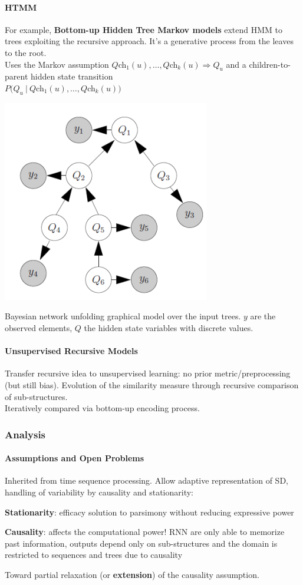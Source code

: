 \documentclass[10pt]{report}
\begin{document}
\paragraph{HTMM} For example, \textbf{Bottom-up Hidden Tree Markov models} extend HMM to trees exploiting the recursive approach. It's a generative process from the leaves to the root.\\
Uses the Markov assumption $Q$ch$_1(u),\ldots,Q$ch$_k(u)\Rightarrow Q_u$ and a children-to-parent hidden state transition\\$P(Q_u\:|\:Q$ch$_1(u),\ldots,Q$ch$_k(u))$
\begin{center}
	\includegraphics[scale=0.5]{46.png}
\end{center}
Bayesian network unfolding graphical model over the input trees. $y$ are the observed elements, $Q$ the hidden state variables with discrete values.
\paragraph{Unsupervised Recursive Models} Transfer recursive idea to unsupervised learning: no prior metric/preprocessing (but still bias). Evolution of the similarity measure through recursive comparison of sub-structures.\\
Iteratively compared via bottom-up encoding process.
\subsubsection{Analysis}
\paragraph{Assumptions and Open Problems} Inherited from time sequence processing. Allow adaptive representation of SD, handling of variability by causality and stationarity:
\begin{list}{}{}
	\item \textbf{Stationarity}: efficacy solution to parsimony without reducing expressive power
	\item \textbf{Causality}: affects the computational power! RNN are only able to memorize past information, outputs depend only on sub-structures and the domain is restricted to sequences and trees due to causality
\end{list}
Toward partial relaxation (or \textbf{extension}) of the causality assumption.
\end{document}
